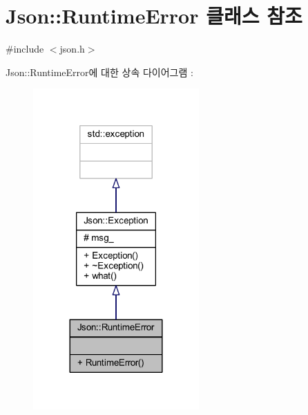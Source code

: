 \hypertarget{class_json_1_1_runtime_error}{}\section{Json\+:\+:Runtime\+Error 클래스 참조}
\label{class_json_1_1_runtime_error}


{\ttfamily \#include $<$json.\+h$>$}



Json\+:\+:Runtime\+Error에 대한 상속 다이어그램 \+: \nopagebreak
\begin{figure}[H]
\begin{center}
\leavevmode
\includegraphics[width=180pt]{class_json_1_1_runtime_error__inherit__graph}
\end{center}
\end{figure}



